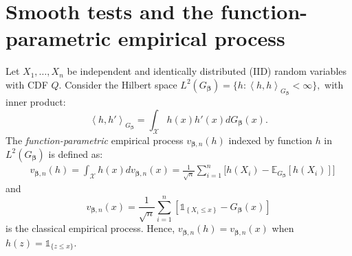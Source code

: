 \documentclass[11pt]{article}
\newcommand{\vect}[1]{\boldsymbol{#1}}
\newcommand{\inner}[1]{\left\langle #1 \right\rangle}
\begin{document}
\section{Smooth tests and the function-parametric empirical process} \label{sec:2}


Let $X_1, \ldots, X_n$ be independent and identically distributed (IID) random variables with CDF $Q$. Consider the Hilbert space $L^2(G_{\vect{\beta}}) = \{ h: \inner{h,h}_{G_{\vect{\beta}}}<\infty\},$
with inner product: 
$$\inner{h,h'}_{G_{\vect{\beta}}} = \int_{\mathcal{X}}h(x)h'(x)dG_{\vect{\beta}}(x).$$
The \textit{function-parametric} empirical process $v_{\vect{\beta},n}(h)$ indexed by function $h$ in $L^2(G_{\vect{\beta}})$ is defined as: 
\begin{equation*}
    \begin{aligned}
    &v_{\vect{\beta},n}(h) = \int_{\mathcal{X}}h(x)dv_{\vect{\beta},n}(x) = 
    \frac{1}{\sqrt{n}}\sum_{i=1}^n \bigl[h (X_i)- \mathbb{E}_{G_{\vect{{\beta}}}}[h (X_i)]
\bigl]
    \label{eqn:2dv}
    \end{aligned}
\end{equation*}
and 
$$v_{\vect{\beta},n}(x) = \frac{1}{\sqrt{n}} \sum\limits_{i=1}^n \left[\mathds{1}_{\left\{X_{i} \leq x\right\}}-G_{\vect{\beta}}(x)\right]$$
is the classical empirical process. Hence, $v_{\vect{\beta},n}(h) = v_{\vect{\beta},n}(x)$ when $h(z)=\mathds{1}_{\{z\leq x\}}$. 
\end{document}
